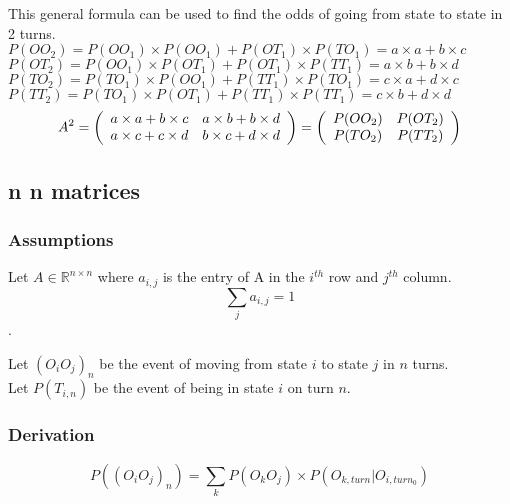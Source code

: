 This general formula can be used to find the odds of going from state to state in 2 turns.\\
$P(OO_2) = P(OO_1) \times P(OO_1)+P(OT_1) \times P(TO_1) = a \times a + b \times c$\\
$P(OT_2) = P(OO_1) \times P(OT_1)+P(OT_1) \times P(TT_1) = a \times b + b \times d$\\
$P(TO_2) = P(TO_1) \times P(OO_1)+P(TT_1) \times P(TO_1) = c \times a + d \times c$\\
$P(TT_2) = P(TO_1) \times P(OT_1)+P(TT_1) \times P(TT_1) = c \times b + d \times d$
\[
A^2 = 
\left(
\begin{array}{c c}
a \times a+b \times c & a \times b+b \times d \\
a \times c+c \times d & b \times c+d \times d \\
\end{array}
\right)
=
\left(
\begin{array}{c c}
P(OO_2) & P(OT_2) \\
P(TO_2) & P(TT_2) \\
\end{array}
\right) \]

\subsection{n \times n matrices}
\subsubsection{Assumptions}
Let  $A \in \mathbb{R}^{n \times n}$ where $a_{i,j}$ is the entry of A in the $i^{th}$ row and $j^{th}$ column.\\
$$\sum_{j} a_{i,j} = 1$$.

Let $(O_iO_j)_n$ be the event of moving from state $i$ to state $j$ in $n$ turns.\\
Let $P(T_{i,n})$ be the event of being in state $i$ on turn $n$.

\subsubsection{Derivation}
$$P((O_iO_j)_n) =  \sum_{k} P(O_kO_j) \times P(O_{k,turn}|O_{i,turn_0})$$ 
